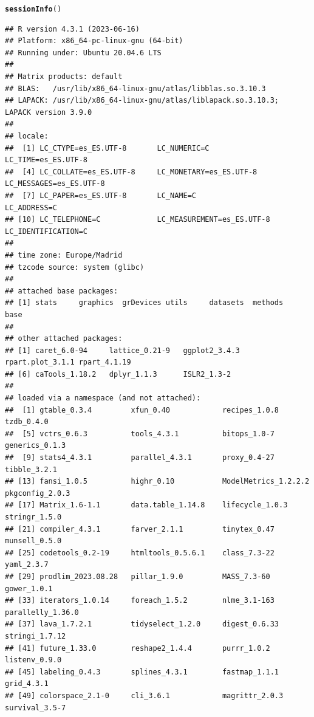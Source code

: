 \documentclass{article}\usepackage[]{graphicx}\usepackage[]{xcolor}
\makeatletter
\newcommand{\hlstd}[1]{\textcolor[rgb]{0.345,0.345,0.345}{#1}}%
\newcommand{\hlkwd}[1]{\textcolor[rgb]{0.737,0.353,0.396}{\textbf{#1}}}%
\newenvironment{kframe}{%
 \def\at@end@of@kframe{}%
 \ifinner\ifhmode%
  \def\at@end@of@kframe{\end{minipage}}%
  \begin{minipage}{\columnwidth}%
 \fi\fi%
 \def\FrameCommand##1{\hskip\@totalleftmargin \hskip-\fboxsep
 \colorbox{shadecolor}{##1}\hskip-\fboxsep
     \hskip-\linewidth \hskip-\@totalleftmargin \hskip\columnwidth}%
 \MakeFramed {\advance\hsize-\width
   \@totalleftmargin\z@ \linewidth\hsize
   \@setminipage}}%
 {\par\unskip\endMakeFramed%
 \at@end@of@kframe}
\newenvironment{knitrout}{}{} %
\makeatother
\begin{document}
\begin{knitrout}
\color{fgcolor}\begin{kframe}
\begin{alltt}
\hlkwd{sessionInfo}\hlstd{()}
\end{alltt}
\begin{verbatim}
## R version 4.3.1 (2023-06-16)
## Platform: x86_64-pc-linux-gnu (64-bit)
## Running under: Ubuntu 20.04.6 LTS
## 
## Matrix products: default
## BLAS:   /usr/lib/x86_64-linux-gnu/atlas/libblas.so.3.10.3 
## LAPACK: /usr/lib/x86_64-linux-gnu/atlas/liblapack.so.3.10.3;  LAPACK version 3.9.0
## 
## locale:
##  [1] LC_CTYPE=es_ES.UTF-8       LC_NUMERIC=C               LC_TIME=es_ES.UTF-8       
##  [4] LC_COLLATE=es_ES.UTF-8     LC_MONETARY=es_ES.UTF-8    LC_MESSAGES=es_ES.UTF-8   
##  [7] LC_PAPER=es_ES.UTF-8       LC_NAME=C                  LC_ADDRESS=C              
## [10] LC_TELEPHONE=C             LC_MEASUREMENT=es_ES.UTF-8 LC_IDENTIFICATION=C       
## 
## time zone: Europe/Madrid
## tzcode source: system (glibc)
## 
## attached base packages:
## [1] stats     graphics  grDevices utils     datasets  methods   base     
## 
## other attached packages:
## [1] caret_6.0-94     lattice_0.21-9   ggplot2_3.4.3    rpart.plot_3.1.1 rpart_4.1.19    
## [6] caTools_1.18.2   dplyr_1.1.3      ISLR2_1.3-2     
## 
## loaded via a namespace (and not attached):
##  [1] gtable_0.3.4         xfun_0.40            recipes_1.0.8        tzdb_0.4.0          
##  [5] vctrs_0.6.3          tools_4.3.1          bitops_1.0-7         generics_0.1.3      
##  [9] stats4_4.3.1         parallel_4.3.1       proxy_0.4-27         tibble_3.2.1        
## [13] fansi_1.0.5          highr_0.10           ModelMetrics_1.2.2.2 pkgconfig_2.0.3     
## [17] Matrix_1.6-1.1       data.table_1.14.8    lifecycle_1.0.3      stringr_1.5.0       
## [21] compiler_4.3.1       farver_2.1.1         tinytex_0.47         munsell_0.5.0       
## [25] codetools_0.2-19     htmltools_0.5.6.1    class_7.3-22         yaml_2.3.7          
## [29] prodlim_2023.08.28   pillar_1.9.0         MASS_7.3-60          gower_1.0.1         
## [33] iterators_1.0.14     foreach_1.5.2        nlme_3.1-163         parallelly_1.36.0   
## [37] lava_1.7.2.1         tidyselect_1.2.0     digest_0.6.33        stringi_1.7.12      
## [41] future_1.33.0        reshape2_1.4.4       purrr_1.0.2          listenv_0.9.0       
## [45] labeling_0.4.3       splines_4.3.1        fastmap_1.1.1        grid_4.3.1          
## [49] colorspace_2.1-0     cli_3.6.1            magrittr_2.0.3       survival_3.5-7      

\end{verbatim}
\end{kframe}
\end{knitrout}
\end{document}

